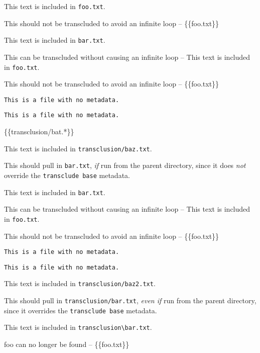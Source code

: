 
\def\mytitle{Transclusion}


This text is included in \texttt{foo.txt}.

This should not be transcluded to avoid an infinite loop -- \{\{foo.txt\}\}

This text is included in \texttt{bar.txt}.

This can be transcluded without causing an infinite loop --
This text is included in \texttt{foo.txt}.

This should not be transcluded to avoid an infinite loop -- \{\{foo.txt\}\}

\begin{verbatim}
This is a file with no metadata.
\end{verbatim}

\begin{verbatim}
This is a file with no metadata.
\end{verbatim}

\{\{transclusion\slash bat.*\}\}

This text is included in \texttt{transclusion\slash baz.txt}.

This should pull in \texttt{bar.txt}, \emph{if} run from the parent directory, since it
does \emph{not} override the \texttt{transclude base} metadata.

This text is included in \texttt{bar.txt}.

This can be transcluded without causing an infinite loop --
This text is included in \texttt{foo.txt}.

This should not be transcluded to avoid an infinite loop -- \{\{foo.txt\}\}

\begin{verbatim}
This is a file with no metadata.
\end{verbatim}

\begin{verbatim}
This is a file with no metadata.
\end{verbatim}

This text is included in \texttt{transclusion\slash baz2.txt}.

This should pull in \texttt{transclusion\slash bar.txt}, \emph{even if} run from the parent
directory, since it overrides the \texttt{transclude base} metadata.

This text is included in \texttt{transclusion\textbackslash{}bar.txt}.

foo can no longer be found -- \{\{foo.txt\}\}



